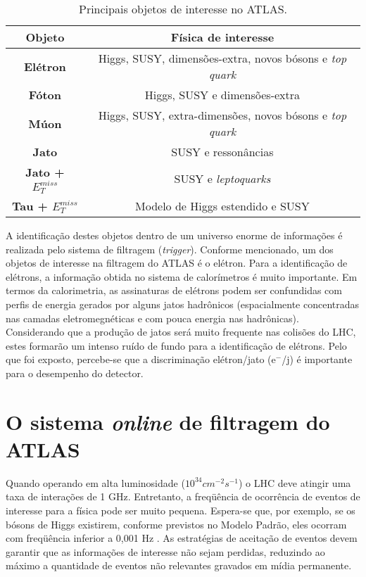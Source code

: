 \begin{table}[h!]
\centering
\begin{tabular}{c c }
  \hline
  \textbf{Objeto}    & \textbf{Física de interesse}       \\  \hline
  \textbf{Elétron}   &  Higgs, SUSY, dimensões-extra, novos bósons e \textit{top quark}\\
  \textbf{Fóton}    &  Higgs, SUSY e dimensões-extra\\
  \textbf{Múon}      & Higgs, SUSY, extra-dimensões, novos bósons e \textit{top quark}\\
  \textbf{Jato}   &  SUSY e ressonâncias\\
  \textbf{Jato + $E_T^{miss}$}    &SUSY e \textit{leptoquarks}\\
  \textbf{Tau + $E_T^{miss}$}      & Modelo de Higgs estendido e SUSY\\
  \hline
\end{tabular}
\caption{Principais objetos de interesse no ATLAS.}
\label{tab_fisica}
\end{table}

A identificação destes objetos dentro de um universo enorme de
informações é realizada pelo sistema de filtragem
(\textit{trigger}). Conforme mencionado, um dos objetos de
interesse na filtragem do ATLAS é o elétron. Para a identificação
de elétrons, a informação obtida no sistema de calorímetros é
muito importante. Em termos da calorimetria, as assinaturas de
elétrons podem ser confundidas com perfis de energia gerados por
alguns jatos hadrônicos (espacialmente concentradas nas camadas
eletromegnéticas e com pouca energia nas hadrônicas). Considerando
que a produção de jatos será muito frequente nas colisões do LHC,
estes formarão um intenso ruído de fundo para a identificação de
elétrons. Pelo que foi exposto, percebe-se que a discriminação
elétron/jato (e$^-$/j) é importante para o desempenho do detector.


\section{O sistema \textit{online} de filtragem do ATLAS}
\label{sec_trig}

Quando operando em alta luminosidade ($10^{34}cm^{-2}s^{-1}$) o
LHC deve atingir uma taxa de interações de 1 GHz. Entretanto, a
freqüência de ocorrência de eventos de interesse para a física
pode ser muito pequena. Espera-se que, por exemplo, se os bósons
de Higgs existirem, conforme previstos no Modelo Padrão, eles
ocorram com freqüência inferior a 0,001 Hz \cite{TDR:ATLAS:1998}.
As estratégias de aceitação de eventos devem garantir que as
informações de interesse não sejam perdidas, reduzindo ao máximo a
quantidade de eventos não relevantes gravados em mídia permanente.

